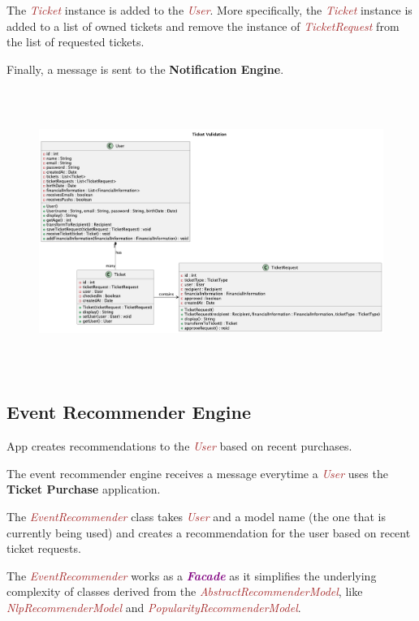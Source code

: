 \documentclass{article}
\newcommand{\designpattern}[1]{\textbf{\textit{\textcolor{purple}{#1}}}}
\newcommand{\designclass}[1]{\textit{\textcolor{brown}{#1}}}
\newcommand{\application}[1]{\textbf{\textcolor{codegreen}{#1}}}
\begin{document}
The \designclass{Ticket} instance is added to the \designclass{User}. More specifically, the \designclass{Ticket} instance is added to a list of owned tickets and remove the instance of \designclass{TicketRequest} from the list of requested tickets.

Finally, a message is sent to the \application{Notification Engine}.

\begin{figure}[h]
    \centering
    \includegraphics[width=\textwidth, height=350px, keepaspectratio]{assets/uml/relations/TicketValidation.png}
\end{figure}

\FloatBarrier
\subsection{Event Recommender Engine}
App creates recommendations to the \designclass{User} based on recent purchases.

The event recommender engine receives a message everytime a \designclass{User} uses the \application{Ticket Purchase} application.

The \designclass{EventRecommender} class takes \designclass{User} and a model name (the one that is currently being used) and creates a recommendation for the user based on recent ticket requests.

The \designclass{EventRecommender} works as a \designpattern{Facade} as it simplifies the underlying complexity of classes derived from the \designclass{AbstractRecommenderModel}, like \designclass{NlpRecommenderModel} and \designclass{PopularityRecommenderModel}.
\end{document}
